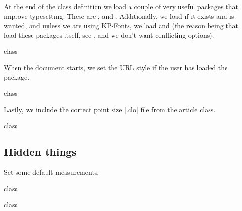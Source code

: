 \documentclass{skdoc}
\begin{document}
	At the end of the class definition we load a couple of very
	useful packages that improve typesetting. These are
	,  and . Additionally,
	we load  if it exists and is wanted, and unless we
	are using KP-Fonts, we load  and  (the
	reason being that  load these packages itself, see
	\textcite[p.~1]{kpfonts}, and we don't want conflicting options).
\begin{MacroCode}{class}
\end{MacroCode}
	
	When the document starts, we set the URL style if the user has
	loaded the  package.
\begin{MacroCode}{class}
\end{MacroCode}

	Lastly, we include the correct point size |.clo| file from the
	\textsf{article} class.
\begin{MacroCode}{class}

\end{MacroCode}
	
	\subsection{Hidden things}
	Set some default measurements.
\begin{MacroCode}{class}
\addtolength\textwidth{0.5\oddsidemargin}
\addtolength\textwidth{0.5\evensidemargin}
\addtolength\oddsidemargin{-0.5\oddsidemargin}
\addtolength\evensidemargin{-0.5\evensidemargin}
\setlength{}
\setlength{}
\end{MacroCode}
	\begin{macro}{\baselinestretch}
\begin{MacroCode}{class}
\renewcommand\baselinestretch{}
\end{MacroCode}
	\end{macro}
\end{document}
